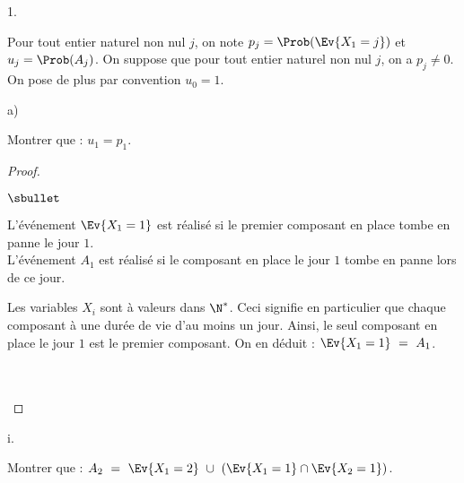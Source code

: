 \documentclass[11pt]{article}%
\begin{document}
\begin{noliste}{1.}
  \setlength{\itemsep}{2mm} \setcounter{enumi}{3}
\item Pour tout entier naturel non nul $j$, on note
  $p_j=\Prob(\Ev{X_1=j})$ et $u_j=\Prob(A_j)$. On suppose que pour
  tout entier naturel non nul $j$, on a $p_j \neq 0$. On pose de plus
  par convention $u_0=1$.
  \begin{noliste}{a)}
  \item Montrer que : $u_1 = p_1$.\\[-.8cm]

    \begin{proof}~%
      \begin{noliste}{$\sbullet$}
      \item L'événement $\Ev{X_1 = 1}$ est réalisé si le premier
        composant en place tombe en panne le jour $1$.\\
        L'événement $A_1$ est réalisé si le composant en place le jour
        $1$ tombe en panne lors de ce jour.

      \item Les variables $X_i$ sont à valeurs dans $\N^*$. Ceci
        signifie en particulier que chaque composant à une durée de
        vie d'au moins un jour. Ainsi, le seul composant en place le
        jour $1$ est le premier composant. On en déduit : $\Ev{X_1 =
          1} \ = \ A_1$.
      \end{noliste}
      ~\\[-1.4cm]
      ~\\[-1.4cm]
    \end{proof}
    



  \item
    \begin{nonoliste}{i.}
    \item Montrer que : $A_2 \ = \ \Ev{X_1=2} \ \cup \
      \left(\Ev{X_1=1} \cap \Ev{X_2=1}\right)$.
      \end{nonoliste}


\end{noliste}
\end{noliste}
\end{document}

